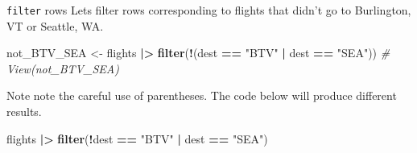 \documentclass[
  ignorenonframetext,
]{beamer}
\newenvironment{Shaded}{\begin{snugshade}}{\end{snugshade}}
\newcommand{\CommentTok}[1]{\textcolor[rgb]{0.56,0.35,0.01}{\textit{#1}}}
\newcommand{\FunctionTok}[1]{\textcolor[rgb]{0.13,0.29,0.53}{\textbf{#1}}}
\newcommand{\NormalTok}[1]{#1}
\newcommand{\OtherTok}[1]{\textcolor[rgb]{0.56,0.35,0.01}{#1}}
\newcommand{\SpecialCharTok}[1]{\textcolor[rgb]{0.81,0.36,0.00}{\textbf{#1}}}
\newcommand{\StringTok}[1]{\textcolor[rgb]{0.31,0.60,0.02}{#1}}
\begin{document}
\begin{frame}[fragile]{\texttt{filter} rows}
\protect\hypertarget{filter-rows-4}{}
Lets filter rows corresponding to flights that didn't go to Burlington,
VT or Seattle, WA.

\normalsize

\begin{Shaded}
\begin{Highlighting}[]
\NormalTok{not\_BTV\_SEA }\OtherTok{\textless{}{-}}\NormalTok{ flights }\SpecialCharTok{|\textgreater{}} 
  \FunctionTok{filter}\NormalTok{(}\SpecialCharTok{!}\NormalTok{(dest }\SpecialCharTok{==} \StringTok{"BTV"} \SpecialCharTok{|}\NormalTok{ dest }\SpecialCharTok{==} \StringTok{"SEA"}\NormalTok{))}
\CommentTok{\# View(not\_BTV\_SEA)}
\end{Highlighting}
\end{Shaded}

\normalsize

Note note the careful use of parentheses. The code below will produce
different results. \normalsize

\begin{Shaded}
\begin{Highlighting}[]
\NormalTok{flights }\SpecialCharTok{|\textgreater{}} 
  \FunctionTok{filter}\NormalTok{(}\SpecialCharTok{!}\NormalTok{dest }\SpecialCharTok{==} \StringTok{"BTV"} \SpecialCharTok{|}\NormalTok{ dest }\SpecialCharTok{==} \StringTok{"SEA"}\NormalTok{)}
\end{Highlighting}
\end{Shaded}

\normalsize
\end{frame}
\end{document}
